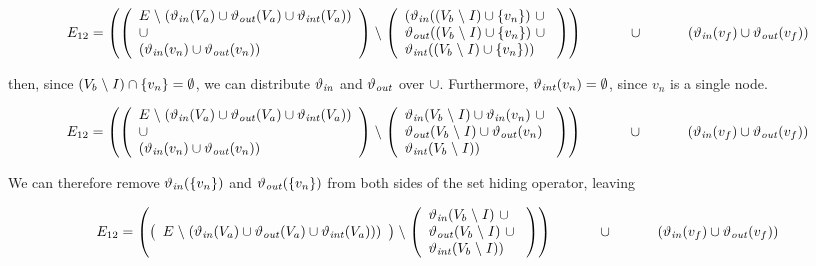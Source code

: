 \[
E_{12}  =  \left( \left(
\begin{array}{l}  E\hide(\INN(V_a) \union \OUT(V_a) \union \INT(V_a)) \\  \union \\ (\INN(v_n) \union \OUT(v_n) ) \\
\end{array} \right)
\hide    \left( \begin{array}{l}
  ( \INN((V_b\hide I)\union\{v_{n}\})~ \union\ \\ \OUT((V_b\hide I)\union\{v_{n}\})~ \union\ \\ \INT((V_b\hide I)\union\{v_n\}) ) 
         \end{array}
         \right) \right) \\
\hphantom{E_{12}  = \;\; }   \union\ \\
\hphantom{E_{12}  = \;\;}   (\INN(v_f) \union \OUT(v_f))\\ 
\]

\noindent
then, since $(V_b\mathrel{\backslash} I) \cap \{v_{n}\} = \emptyset$, we can distribute $\mathit{\vartheta_{in}}$ and $\mathit{\vartheta_{out}}$  over $\cup$. Furthermore,  $\mathit{\vartheta_{int}}(v_n) = \emptyset$, since $v_n$ is a single node.

\[
E_{12}  =  \left( \left(
\begin{array}{l}
  E\hide(\INN(V_a) \union \OUT(V_a) \union \INT(V_a)) \\  \union \\ (\INN(v_n) \union \OUT(v_n) ) \\
\end{array} \right)
   \hide
   \left( \begin{array}{l}
     \INN(V_b\hide I)\union \INN(v_n) ~\union\ \\
     \OUT(V_b\hide I)\union \OUT(v_n)  \\
     \INT(V_b\hide I)) 
   \end{array}
   \right) \right) \\
   \hphantom{E_{12}  = \;\; }   \union\ \\
\hphantom{E_{12}  = \;\;}   (\INN(v_f) \union \OUT(v_f))\\ 
\]

\noindent
We can therefore remove $\mathit{\vartheta_{in}}(\{v_n\})$ and $\mathit{\vartheta_{out}}(\{v_n\})$ from both sides of the set hiding operator, leaving 

\[
E_{12}  =  \left( \left(
  \begin{array}{l}
  E\hide(\INN(V_a) \union \OUT(V_a) \union \INT(V_a)) ) \\
  \end{array} \right)
   \hide
   \left( \begin{array}{l}
     \INN(V_b\hide I) ~\union\ \\
     \OUT(V_b\hide I) ~\union\ \\
          \INT(V_b\hide I)) 
   \end{array}
   \right) \right) \\
   \hphantom{E_{12}  = \;\; }   \union\ \\
\hphantom{E_{12}  = \;\;}   (\INN(v_f) \union \OUT(v_f))\\ 
\]


